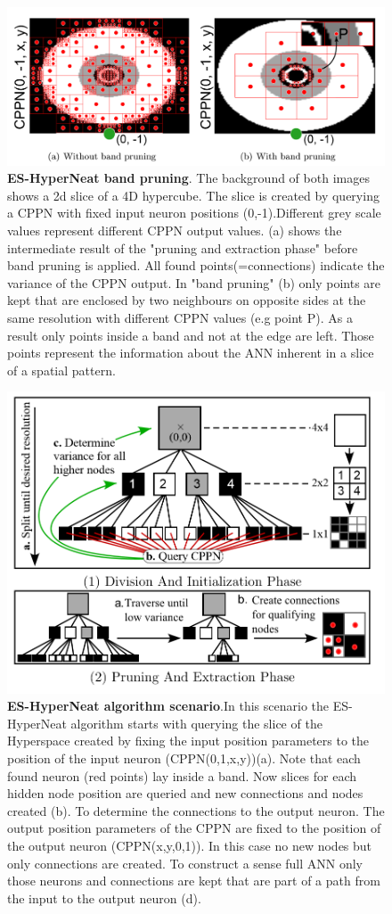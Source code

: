 \begin{figure}[tb]
	\centering
	\includegraphics[width=0.7\linewidth]{figures/ES-HyperNEAT/ES-HyperNeatBandPruning}
	\caption[ES-HyperNeat band pruning]{\textbf{ES-HyperNeat band pruning}. The background of both images shows a 2d slice of a 4D hypercube. The slice is created by querying a CPPN with fixed input neuron positions (0,-1).Different grey scale values represent different CPPN output values. (a) shows the intermediate result of the "pruning and extraction phase" before band pruning is applied. All found points(=connections) indicate the variance of the CPPN output. In "band pruning" (b) only points are kept that are enclosed by two neighbours on opposite sides at the same resolution with different CPPN values (e.g point P). As a result only points inside a band and not at the edge are left. Those points represent the information about the ANN inherent in a slice of a spatial pattern. \cite[p. 15]{ESHyperNEATarticle}}
	\label{fig:es-hyperneatbandpruning}
\end{figure}


\begin{figure}[tb]
	\centering
	\includegraphics[width=0.7\linewidth]{figures/ES-HyperNEAT/Es-HyperNEATPhases}
	\caption[ES-HyperNeat algorithm]{\textbf{ES-HyperNeat algorithm scenario}.In this scenario the ES-HyperNeat algorithm starts with querying the slice of the Hyperspace created by fixing the input position parameters to the position of the input neuron (CPPN(0,1,x,y))(a). Note that each found neuron (red points) lay inside a band. Now slices for each hidden node position are queried and new connections and nodes created (b). To determine the connections to the output neuron. The output position parameters of the CPPN are fixed to the position of the output neuron (CPPN(x,y,0,1)). In this case no new nodes but only connections are created. To construct a sense full ANN only those neurons and connections are kept that are part of a path from the input to the output neuron (d). \cite[p. 17]{ESHyperNEATarticle}}
	\label{fig:es-hyperneatphases}
\end{figure}

